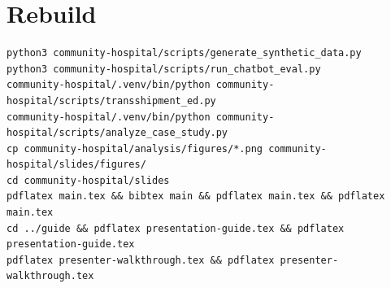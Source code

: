 \documentclass[11pt,a4paper]{article}
\begin{document}
\section{Rebuild}

\begin{verbatim}
python3 community-hospital/scripts/generate_synthetic_data.py
python3 community-hospital/scripts/run_chatbot_eval.py
community-hospital/.venv/bin/python community-hospital/scripts/transshipment_ed.py
community-hospital/.venv/bin/python community-hospital/scripts/analyze_case_study.py
cp community-hospital/analysis/figures/*.png community-hospital/slides/figures/
cd community-hospital/slides
pdflatex main.tex && bibtex main && pdflatex main.tex && pdflatex main.tex
cd ../guide && pdflatex presentation-guide.tex && pdflatex presentation-guide.tex
pdflatex presenter-walkthrough.tex && pdflatex presenter-walkthrough.tex
\end{verbatim}
\end{document}
